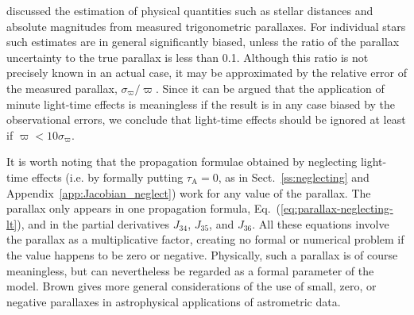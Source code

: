 \documentclass{aa}
\begin{document}
\citet{brown1997} discussed the estimation of physical quantities such as stellar distances and
absolute magnitudes from measured trigonometric parallaxes. For individual stars such
estimates are in general significantly biased, unless the ratio of the parallax uncertainty
to the true parallax is less than 0.1. Although this ratio is not precisely known in an actual case,
it may be approximated by the relative error of the measured parallax, $\sigma_\varpi/\varpi$.
Since it can be argued that the application of minute light-time effects is meaningless if the
result is in any case biased by the observational errors, we conclude that light-time effects
should be ignored at least if $\varpi < 10\sigma_\varpi$.

It is worth noting that the propagation formulae obtained by neglecting light-time effects
(i.e. by formally putting $\tau_\mathrm{A}=0$, as in Sect.~\ref{ss:neglecting} and
Appendix~\ref{app:Jacobian_neglect}) work for any value of the parallax. The parallax
only appears in one propagation formula, Eq.~(\ref{eq:parallax-neglecting-lt}), and in the
partial derivatives $J_{34}$, $J_{35}$, and $J_{36}$. All these equations involve the parallax
as a multiplicative factor, creating no formal or numerical problem if the value happens to
be zero or negative. Physically, such a parallax is of course meaningless, but can nevertheless
be regarded as a formal parameter of the model. Brown \citep[in][Ch.~16]{2013asas.book.....V}
gives more general considerations of the use of small, zero, or negative parallaxes in
astrophysical applications of astrometric data.
\end{document}
